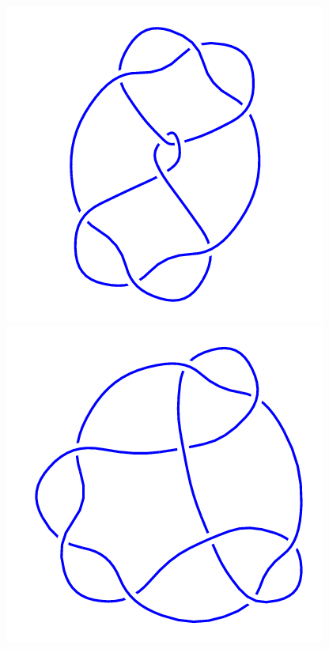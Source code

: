 \begin{figure}[H]
    \begin{minipage}[b]{.18\linewidth}
        \centering
        \includegraphics[width=\linewidth]{../data/9_16.png}
    \end{minipage}
    \begin{minipage}[b]{.18\linewidth}
        \centering
        \includegraphics[width=\linewidth]{../data/9_17.png}

\end{minipage}
\end{figure}
